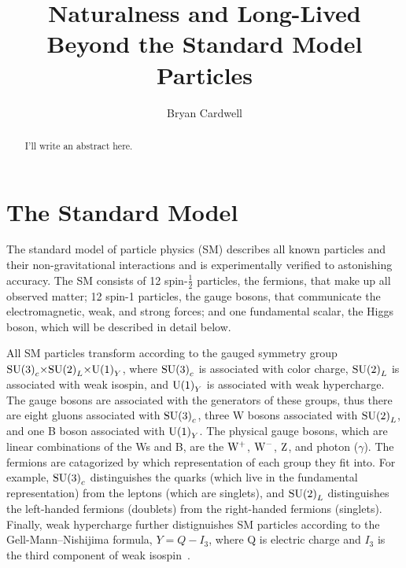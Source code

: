 \documentclass[12pt]{article}
\title{Naturalness and Long-Lived Beyond the Standard Model Particles}
\author{Bryan Cardwell}
\begin{document}
\singlespacing
\maketitle

\begin{abstract}

I'll write an abstract here.

\end{abstract}

\newpage
\tableofcontents
\newpage
\doublespacing
{}


\section{The Standard Model} \label{SM}
    The standard model of particle physics (SM) describes all known particles and their non-gravitational interactions and is experimentally verified to astonishing  accuracy. The SM consists of \num{12} spin-$\frac{1}{2}$ particles, the fermions, that make up all observed matter; \num{12} spin-1 particles, the gauge bosons, that communicate the electromagnetic, weak, and strong forces; and one fundamental scalar, the Higgs boson, which will be described in detail below.
    
    All SM particles transform according to the gauged symmetry group $\mathrm{SU} {\left(3\right)}_c {\times} \mathrm{SU} {\left(2\right)}_L {\times} \mathrm{U} {\left(1\right)}_Y$, where $\mathrm{SU} {\left(3\right)}_c$ is associated with color charge, $\mathrm{SU} {\left(2\right)}_L$ is associated with weak isospin, and $\mathrm{U} {\left(1\right)}_Y$ is associated with weak hypercharge. The gauge bosons are associated with the generators of these groups, thus there are eight gluons associated with $\mathrm{SU} {\left(3\right)}_c$, three W bosons associated with $\mathrm{SU} {\left(2\right)}_L$, and one B boson associated with $\mathrm{U} {\left(1\right)}_Y$. The physical gauge bosons, which are linear combinations of the Ws and B, are the $\mathrm{W}^+$, $\mathrm{W}^-$, $\mathrm{Z}$, and photon ($\gamma$). The fermions are catagorized by which representation of each group they fit into. For example, $\mathrm{SU} {\left(3\right)}_c$ distinguishes the quarks (which live in the fundamental representation) from the leptons (which are singlets), and $\mathrm{SU} {\left(2\right)}_L$ distinguishes the left-handed fermions (doublets) from the right-handed fermions (singlets). Finally, weak hypercharge further distignuishes SM particles according to the Gell-Mann--Nishijima formula, $Y=Q-I_3$, where Q is electric charge and $I_3$ is the third component of weak isospin~\cite{sm_intro}.
\end{document}
